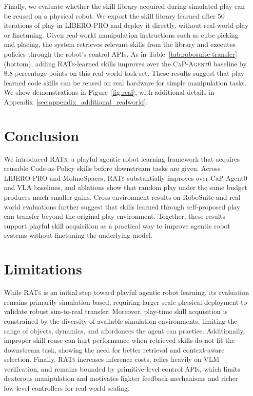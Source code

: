 \documentclass{llmxive}
\begin{document}
Finally, we evaluate whether the skill library acquired during simulated play can be reused on a physical robot. We export the skill library learned after 50 iterations of play in LIBERO-PRO and deploy it directly, without real-world play or finetuning. Given real-world manipulation instructions such as cube picking and placing, the system retrieves relevant skills from the library and executes policies through the robot's control APIs. As in Table~\ref{tab:robosuite-transfer} (bottom), adding \textsc{RATs}-learned skills improves over the \textsc{CaP-Agent0} baseline by 8.8 percentage points on this real-world task set. These results suggest that play-learned code skills can be reused on real hardware for simple manipulation tasks. We show demonstrations in Figure~\ref{fig:real}, with additional details in Appendix~\ref{sec:appendix_additional_realworld}.

	
\section{Conclusion}
\label{sec:conclusion}

We introduced \textsc{RATs}, a playful agentic robot learning framework that
acquires reusable Code-as-Policy skills before downstream tasks are given.
Across LIBERO-PRO and MolmoSpaces, \textsc{RATs} substantially improves over CaP-Agent0 and VLA
baselines, and ablations show that random play under the same budget produces
much smaller gains. Cross-environment results on RoboSuite and real-world evaluations further suggest that
skills learned through self-proposed play can transfer beyond the original play
environment. Together, these results support playful skill acquisition as a
practical way to improve agentic robot systems without finetuning the underlying
model.

\section*{Limitations}
While \textsc{RATs} is an initial step toward playful agentic robot learning, its evaluation remains primarily simulation-based, requiring larger-scale physical deployment to validate robust sim-to-real transfer. Moreover, play-time skill acquisition is constrained by the diversity of available simulation environments, limiting the range of objects, dynamics, and affordances the agent can practice. Additionally, improper skill reuse can hurt performance when retrieved skills do not fit the downstream task, showing the need for better retrieval and context-aware selection. Finally, \textsc{RATs} increases inference costs, relies heavily on VLM verification, and remains bounded by primitive-level control APIs, which limits dexterous manipulation and motivates lighter feedback mechanisms and richer low-level controllers for real-world scaling.
\end{document}
